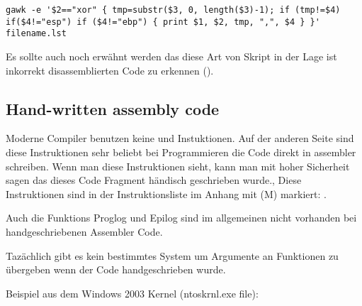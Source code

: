 \begin{lstlisting}
gawk -e '$2=="xor" { tmp=substr($3, 0, length($3)-1); if (tmp!=$4) if($4!="esp") if ($4!="ebp") { print $1, $2, tmp, ",", $4 } }' filename.lst
\end{lstlisting}

Es sollte auch noch erwähnt werden das diese Art von Skript in der Lage ist inkorrekt disassemblierten Code zu erkennen
().

\subsection{Hand-written assembly code}


Moderne Compiler benutzen keine  und  Instuktionen.
Auf der anderen Seite sind diese Instruktionen sehr beliebt bei Programmieren die Code direkt in assembler schreiben.
Wenn man diese Instruktionen sieht, kann man mit hoher Sicherheit sagen das dieses Code Fragment händisch geschrieben wurde.,
Diese Instruktionen sind in der Instruktionsliste im Anhang mit (M) markiert: .


\par

Auch die Funktions Proglog und Epilog sind im allgemeinen nicht vorhanden bei handgeschriebenen Assembler Code. %
\par

Tazächlich gibt es kein bestimmtes System um Argumente an Funktionen zu übergeben wenn der Code handgeschrieben wurde. 

\par
Beispiel aus dem Windows 2003 Kernel
(ntoskrnl.exe file):

